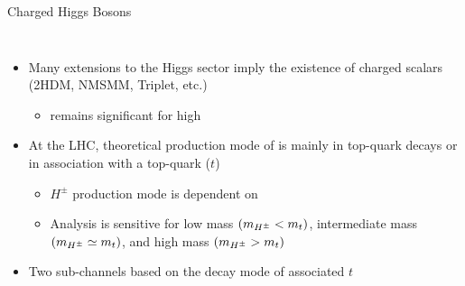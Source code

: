 \documentclass[aspectratio=169,xcolor=table]{beamer}
\begin{document}
    \begin{frame}[t]{Charged Higgs Bosons}
      \begin{columns}
      \begin{itemize}
        \item Many extensions to the Higgs sector imply the existence of charged scalars (2HDM, NMSMM, Triplet, etc.)
        \begin{itemize}
          \item \HpmLong remains significant for high \tanb
        \end{itemize}
        \item At the LHC, theoretical production mode of \mHpm is mainly in top-quark decays or in association with a top-quark ($t$)
        \begin{itemize}
          \item $H^{\pm}$ production mode is dependent on \mHpm
          \item Analysis is sensitive for low mass $(m_{H^{\pm}} < m_{t})$, intermediate mass $(m_{H^{\pm}} \simeq m_{t})$, and high mass $(m_{H^{\pm}} > m_{t})$
        \end{itemize}
        \item Two sub-channels based on the decay mode of associated $t$ 
      \end{itemize}
      \vspace{-.3cm}
      \centering
      \begin{table}
        \end{table}


\end{columns}
\end{frame}
\end{document}
